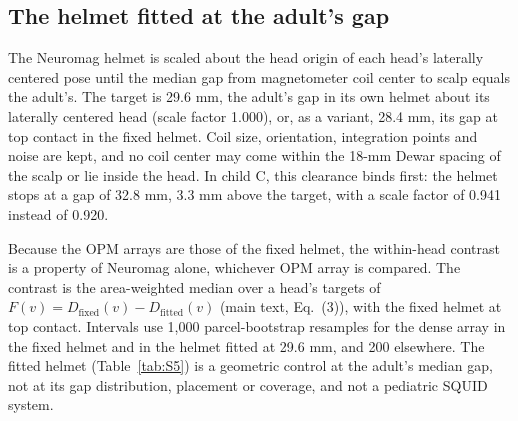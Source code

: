 \documentclass[preprint,12pt,authoryear,a4paper]{elsarticle}
\begin{document}
\subsection{The helmet fitted at the adult's gap}\label{sec:S5.3}

The Neuromag helmet is scaled about the head origin of each head's laterally centered pose until the median gap from magnetometer coil center to scalp equals the adult's. The target is 29.6 mm, the adult's gap in its own helmet about its laterally centered head (scale factor 1.000), or, as a variant, 28.4 mm, its gap at top contact in the fixed helmet. Coil size, orientation, integration points and noise are kept, and no coil center may come within the 18-mm Dewar spacing of the scalp or lie inside the head. In child C, this clearance binds first: the helmet stops at a gap of 32.8 mm, 3.3 mm above the target, with a scale factor of 0.941 instead of 0.920.

Because the OPM arrays are those of the fixed helmet, the within-head contrast is a property of Neuromag alone, whichever OPM array is compared. The contrast is the area-weighted median over a head's targets of $F(v) = D_{\mathrm{fixed}}(v) - D_{\mathrm{fitted}}(v)$ (main text, Eq.~(3)), with the fixed helmet at top contact. Intervals use 1,000 parcel-bootstrap resamples for the dense array in the fixed helmet and in the helmet fitted at 29.6 mm, and 200 elsewhere. The fitted helmet (Table~\ref{tab:S5}) is a geometric control at the adult's median gap, not at its gap distribution, placement or coverage, and not a pediatric SQUID system.
\end{document}
